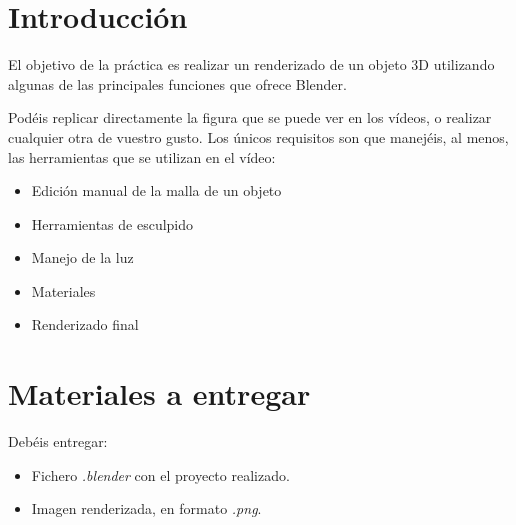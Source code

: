 \documentclass[es,practica]{uah}
\begin{document}

\maketitle


\section{Introducción}

El objetivo de la práctica es realizar un renderizado de un objeto 3D utilizando algunas de las principales funciones que ofrece Blender. 

Podéis replicar directamente la figura que se puede ver en los vídeos, o realizar cualquier otra de vuestro gusto. Los únicos requisitos son que manejéis, al menos, las herramientas que se utilizan en el vídeo: 

\begin{itemize}
	\item Edición manual de la malla de un objeto
	\item Herramientas de esculpido
	\item Manejo de la luz
	\item Materiales
	\item Renderizado final
\end{itemize}

\section{Materiales a entregar}

Debéis entregar:
\begin{itemize}
	\item Fichero \emph{.blender} con el proyecto realizado. 
	\item Imagen renderizada, en formato \emph{.png}.
\end{itemize}
\end{document}
